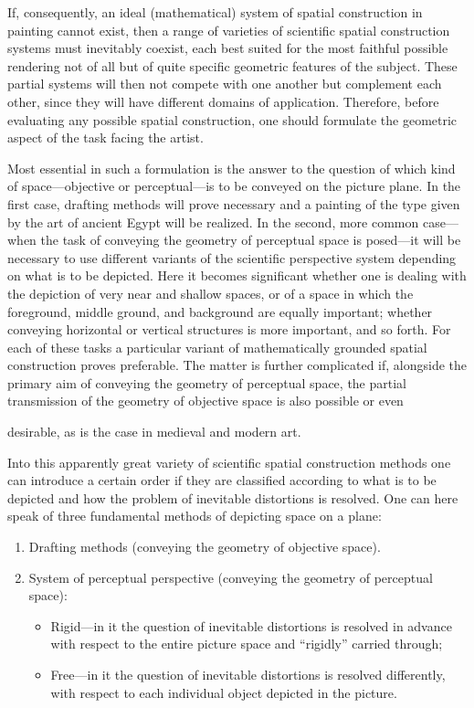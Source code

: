 If, consequently, an ideal (mathematical) system of spatial construction in painting
cannot exist, then a range of varieties of scientific spatial construction systems must
inevitably coexist, each best suited for the most faithful possible rendering not of all
but of quite specific geometric features of the subject.  These partial systems will then
not compete with one another but complement each other, since they will have different
domains of application.  Therefore, before evaluating any possible spatial construction,
one should formulate the geometric aspect of the task facing the artist.

Most essential in such a formulation is the answer to the question of which kind of
space---objective or perceptual---is to be conveyed on the picture plane.  In the first
case, drafting methods will prove necessary and a painting of the type given by the art
of ancient Egypt will be realized.  In the second, more common case---when the task of
conveying the geometry of perceptual space is posed---it will be necessary to use
different variants of the scientific perspective system depending on what is to be depicted.
Here it becomes significant whether one is dealing with the depiction of very near and
shallow spaces, or of a space in which the foreground, middle ground, and background are
equally important; whether conveying horizontal or vertical structures is more
important, and so forth.  For each of these tasks a particular variant of mathematically
grounded spatial construction proves preferable.  The matter is further complicated if,
alongside the primary aim of conveying the geometry of perceptual space, the partial
transmission of the geometry of objective space is also possible or even


desirable, as is the case in medieval and modern art.

Into this apparently great variety of scientific spatial construction methods one can
introduce a certain order if they are classified according to what is to be depicted and
how the problem of inevitable distortions is resolved.  One can here speak of three
fundamental methods of depicting space on a plane:

\begin{enumerate}
  \item Drafting methods (conveying the geometry of objective space).
  \item System of perceptual perspective (conveying the geometry of perceptual space):
    \begin{itemize}
      \item[a)] Rigid---in it the question of inevitable distortions is resolved in advance
        with respect to the entire picture space and ``rigidly'' carried through;
      \item[b)] Free---in it the question of inevitable distortions is resolved differently,
        with respect to each individual object depicted in the picture.
    \end{itemize}
\end{enumerate}

